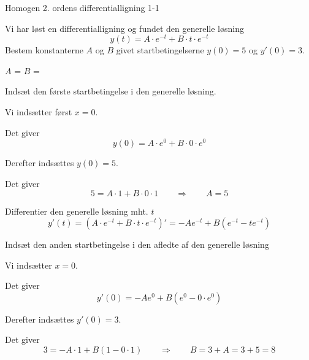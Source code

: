 \documentclass{article}
\begin{document}
\tableofcontents
\newpage


\begin{exercise}{Homogen 2. ordens differentialligning 1-1}

Vi har løst en differentialligning og fundet den generelle løsning
\[
y(t) = A \cdot e^{-t} + B \cdot t \cdot e^{-t}
\]
Bestem konstanterne $A$ og $B$ givet startbetingelserne $y(0)=5$ og $y'(0)=3$.


$A$ = 
$B$ = 

\hint

Indsæt den første startbetingelse i den generelle løsning.


\hint

Vi indsætter først $x=0$.

\hint

Det giver
\[
y(0)= A \cdot e^{0} + B \cdot 0 \cdot e^{0}
\]

\hint

Derefter indsættes $y(0)=5$.

\hint

Det giver
\[
5 = A \cdot 1 + B \cdot 0 \cdot 1 \qquad \Rightarrow \qquad A = 5
\]

\hint

Differentier den generelle løsning mht. $t$
\[
y'(t)= \left(A \cdot e^{-t} + B \cdot t \cdot e^{-t} \right)' = -A e^{-t} + B \left( e^{-t} - t e^{-t} \right)
\]

\hint

Indsæt den anden startbetingelse i den afledte af den generelle løsning

\hint

Vi indsætter $x=0$.

\hint

Det giver
\[
y'(0) = -A e^{0} + B \left( e^{0} - 0 \cdot e^{0} \right)
\]

\hint

Derefter indsættes $y'(0)=3$.

\hint

Det giver
\[
3 = -A \cdot 1 + B \left(1 - 0 \cdot 1 \right) \qquad \Rightarrow \qquad B = 3 + A = 3 + 5 = 8
\]






\end{exercise}
\end{document}
